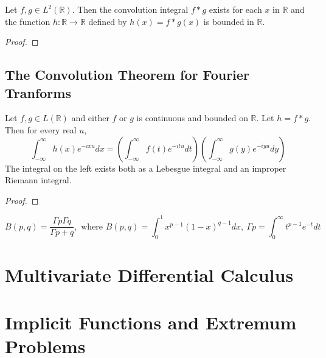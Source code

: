 \begin{theorem}
	Let $f,g \in L^2(\mathbb{R})$. Then the convolution integral $f \ast g$ exists for each $x$ in $\mathbb{R}$ and the function $h : \mathbb{R} \to \mathbb{R}$ defined by $h(x) = f \ast g (x)$ is bounded in $\mathbb{R}$.
\end{theorem}
\begin{synopsis}
\end{synopsis}
\begin{proof}
\end{proof}

\section{The Convolution Theorem for Fourier Tranforms}
\begin{theorem}
	Let $f,g \in L(\mathbb{R})$ and either $f$ or $g$ is continuous and bounded on $\mathbb{R}$. Let $h = f \ast g$. Then for every real $u$,
	$$ \int_{-\infty}^\infty h(x) e^{-ixu} dx = \left( \int_{-\infty}^\infty f(t) e^{-itu} dt \right) \left( \int_{-\infty}^\infty g(y) e^{-iyu} dy \right)$$
	The integral on the left exists both as a Lebesgue integral and an improper Riemann integral.
\end{theorem}
\begin{synopsis}
\end{synopsis}
\begin{proof}
\end{proof}

\begin{remark}
	$$B(p,q) = \frac{\Gamma{p} \Gamma{q}}{\Gamma{p+q}},\text{ where } B(p,q) = \int_0^1 x^{p-1} (1-x)^{q-1} dx,\ \Gamma{p} = \int_0^\infty t^{p-1} e^{-t} dt$$
\end{remark}
\chapter{Multivariate Differential Calculus}
\chapter{Implicit Functions and Extremum Problems}

